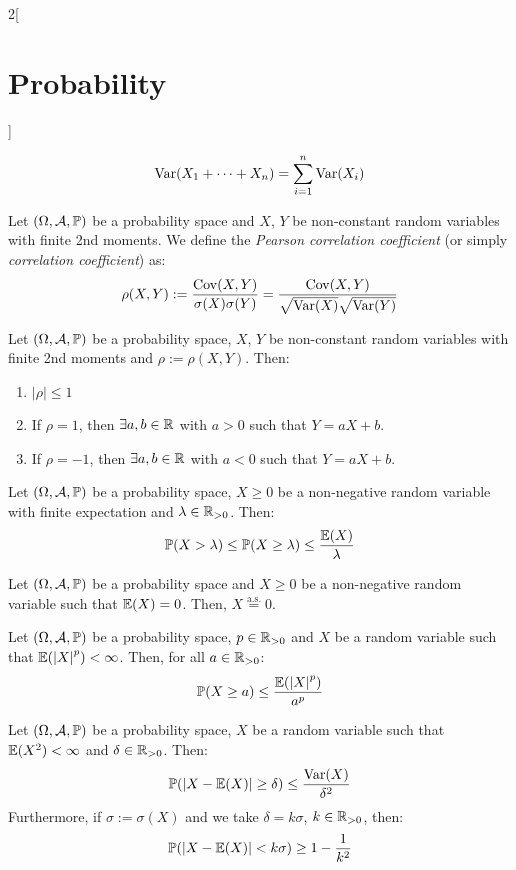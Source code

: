 \documentclass[../../../main.tex]{subfiles}
\begin{document}
\begin{multicols}{2}[\section{Probability}]
\begin{corollary}
    $$\operatorname{Var}(X_1+\cdots+X_n)=\sum_{i=1}^n\operatorname{Var}(X_i)$$
  \end{corollary}
  \begin{definition}
    Let $(\Omega,\mathcal{A},\mathbb{P})$ be a probability space and $X$, $Y$ be non-constant random variables with finite 2nd moments. We define the \textit{Pearson correlation coefficient} (or simply \textit{correlation coefficient}) as: $$\rho(X,Y):=\frac{\operatorname{Cov}(X,Y)}{\sigma(X)\sigma(Y)}=\frac{\operatorname{Cov}(X,Y)}{\sqrt{\operatorname{Var}(X)}\sqrt{\operatorname{Var}(Y)}}$$
  \end{definition}
  \begin{prop}
    Let $(\Omega,\mathcal{A},\mathbb{P})$ be a probability space, $X$, $Y$ be non-constant random variables with finite 2nd moments and $\rho:=\rho(X,Y)$. Then:
    \begin{enumerate}
      \item $|\rho|\leq 1$
      \item If $\rho=1$, then $\exists a,b\in\mathbb{R}$ with $a>0$ such that $Y=aX+b$.
      \item If $\rho=-1$, then $\exists a,b\in\mathbb{R}$ with $a<0$ such that $Y=aX+b$.
    \end{enumerate}
  \end{prop}
  \begin{theorem}
    Let $(\Omega,\mathcal{A},\mathbb{P})$ be a probability space, $X\geq 0$ be a non-negative random variable with finite expectation and $\lambda\in\mathbb{R}_{>0}$. Then:
    $$\mathbb{P}(X>\lambda)\leq \mathbb{P}(X\geq \lambda)\leq \frac{\mathbb{E}(X)}{\lambda}$$
  \end{theorem}
  \begin{corollary}
    Let $(\Omega,\mathcal{A},\mathbb{P})$ be a probability space and $X\geq 0$ be a non-negative random variable such that $\mathbb{E}(X)=0$. Then, $X\overset{\text{a.s.}}{=}0$.
  \end{corollary}
  \begin{corollary}
    Let $(\Omega,\mathcal{A},\mathbb{P})$ be a probability space, $p\in\mathbb{R}_{>0}$ and $X$ be a random variable such that $\mathbb{E}({|X|}^p)<\infty$. Then, for all $a\in\mathbb{R}_{>0}$: $$\mathbb{P}(X\geq a)\leq \frac{\mathbb{E}({|X|}^p)}{a^p}$$
  \end{corollary}
  \begin{corollary}
    Let $(\Omega,\mathcal{A},\mathbb{P})$ be a probability space, $X$ be a random variable such that $\mathbb{E}(X^2)<\infty$ and $\delta\in\mathbb{R}_{>0}$. Then: $$\mathbb{P}(|X-\mathbb{E}(X)|\geq\delta)\leq\frac{\operatorname{Var}(X)}{\delta^2}$$ Furthermore, if $\sigma:=\sigma(X)$ and we take $\delta=k\sigma$, $k\in\mathbb{R}_{>0}$, then: $$\mathbb{P}(|X-\mathbb{E}(X)|<k\sigma)\geq1-\frac{1}{k^2}$$

\end{corollary}
\end{multicols}
\end{document}

